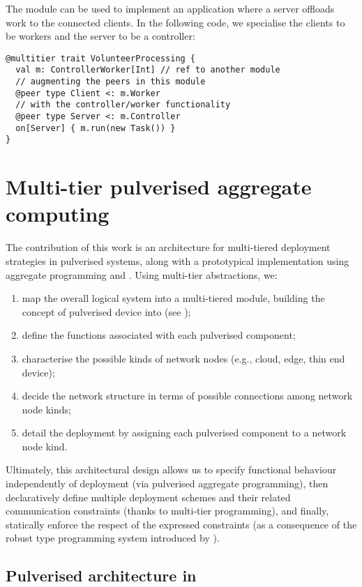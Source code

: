 The module can be used to implement an application where a server offloads work
 to the connected clients. In the following code, 
we specialise the clients to be workers and the server to be a controller:

\begin{verbatim}
@multitier trait VolunteerProcessing {
  val m: ControllerWorker[Int] // ref to another module
  // augmenting the peers in this module
  @peer type Client <: m.Worker
  // with the controller/worker functionality
  @peer type Server <: m.Controller    
  on[Server] { m.run(new Task()) }
}
\end{verbatim}

\section{Multi-tier pulverised aggregate computing}
\label{multitier+pulverisation}

The contribution of this work is an architecture for multi-tiered deployment strategies in pulverised systems,
along with a prototypical implementation using aggregate programming and \scalaloci{}.
% 
Using multi-tier abstractions, we: 
\begin{enumerate}
  \item map the overall logical system into a multi-tiered module, building the concept of pulverised device into \scalaloci{} (see );
  \item define the functions associated with each pulverised component;
  \item characterise the possible kinds of network nodes (e.g., cloud, edge, thin end device);
  \item decide the network structure in terms of possible connections among network node kinds;
  \item detail the deployment by assigning each pulverised component to a network node kind. 
\end{enumerate}

Ultimately, this architectural design allows us to specify functional behaviour independently of deployment
(via pulverised aggregate programming),
then declaratively define multiple deployment schemes and their related communication constraints
(thanks to multi-tier programming),
and finally, statically enforce the respect of the expressed constraints
(as a consequence of the robust type programming system introduced by \scalaloci{}).

\subsection{Pulverised architecture in \scalaloci{}}


